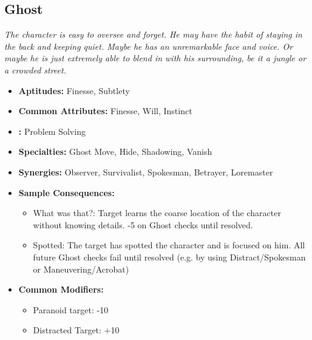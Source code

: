 \subsection{Ghost}\label{Ghost}
\textit{The character is easy to oversee and forget.
He may have the habit of staying in the back and keeping quiet.
Maybe he has an unremarkable face and voice.
Or maybe he is just extremely able to blend in with his surrounding, be it a jungle or a crowded street.}
\begin{itemize}
	\item \textbf{Aptitudes:} Finesse, Subtlety
	\item \textbf{Common Attributes:} Finesse, Will, Instinct
	\item \textbf{:} Problem Solving
	\item \textbf{Specialties:} Ghost Move, Hide, Shadowing, Vanish
	\item \textbf{Synergies:} Observer, Survivalist, Spokesman, Betrayer, Loremaster
	\item \textbf{Sample Consequences:} 
	\begin{itemize}
		\item What was that?: Target learns the coarse location of the character without knowing details. -5 on Ghost checks until resolved.
		\item Spotted: The target has spotted the character and is focused on him. All future Ghost checks fail until resolved (e.g. by using Distract/Spokesman or Maneuvering/Acrobat)
	\end{itemize}
	\item \textbf{Common Modifiers:}
	\begin{itemize}
		\item Paranoid target: -10
		\item Distracted Target: +10
	\end{itemize}
\end{itemize}

